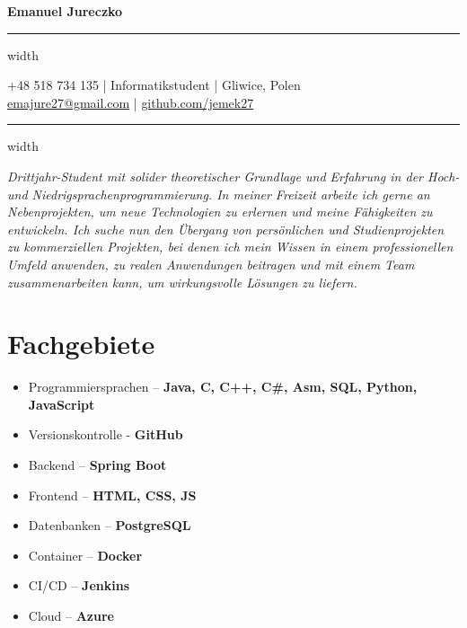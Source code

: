 \documentclass[11pt,letterpaper]{article}
\newcommand{\name}[1]{
  \begin{center}
    \Huge\textbf{#1}
  \end{center}
  \vspace{-0.5em}
  \hrule height 0.4pt width \textwidth
  \vspace{0.5em}
}
\newcommand{\contact}[5]{
  \begin{center}
    #1 | #2 | #3 \\
    #4 | #5
  \end{center}
  \vspace{-0.5em}
  \hrule height 0.4pt width \textwidth
  \vspace{0.5em}
}
\newcommand{\spacedSection}[1]{
  \vspace{0.1em}
  \section{#1}
  \vspace{1em}
}
\begin{document}
\name{Emanuel Jureczko}
\vspace{-0.5em}
\contact{+48 518 734 135}{Informatikstudent}{Gliwice, Polen}
{\href{mailto:emajure27@gmail.com}{emajure27@gmail.com}}{\href{https://github.com/jemek27}{github.com/jemek27}}

\vspace{-0.5em}
\begin{justify}
\textit{Drittjahr-Student mit solider theoretischer Grundlage und Erfahrung in der Hoch- und Niedrigsprachenprogrammierung.
In meiner Freizeit arbeite ich gerne an Nebenprojekten, um neue Technologien zu erlernen und meine Fähigkeiten zu entwickeln.
Ich suche nun den Übergang von persönlichen und Studienprojekten zu kommerziellen Projekten, bei denen ich mein Wissen
in einem professionellen Umfeld anwenden, zu realen Anwendungen beitragen und mit einem Team zusammenarbeiten kann, um wirkungsvolle Lösungen zu liefern.}
\end{justify}

\spacedSection{Fachgebiete}

\begin{minipage}[t]{0.33\textwidth}
    \begin{flushleft}
        \begin{itemize}[leftmargin=0.5cm]
            \setlength\itemsep{0.4em}
            \item Programmiersprachen – \textbf{Java, C, C++, C\#, Asm, SQL, Python, JavaScript}
            \item Versionskontrolle - \textbf{GitHub}
        \end{itemize}
    \end{flushleft}
\end{minipage}
\begin{minipage}[t]{0.33\textwidth}
    \begin{flushleft}
        \begin{itemize}[leftmargin=0.5cm]
        \setlength\itemsep{0.4em}
            \item Backend – \textbf{Spring Boot}
            \item Frontend – \textbf{HTML, CSS, JS}
            \item Datenbanken – \textbf{PostgreSQL}
        \end{itemize}
    \end{flushleft}
\end{minipage}
\begin{minipage}[t]{0.33\textwidth}
    \begin{flushleft}
        \begin{itemize}[leftmargin=0.5cm]
        \setlength\itemsep{0.4em}
            \item Container – \textbf{Docker}
            \item CI/CD – \textbf{Jenkins}
            \item Cloud – \textbf{Azure}
        \end{itemize}
    \end{flushleft}
\end{minipage}
\end{document}
